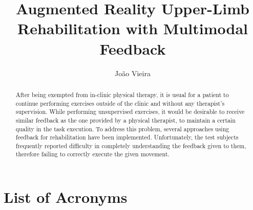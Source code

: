 \documentclass[runningheads]{llncs}
\begin{document}
\label{contbegin}

\title{Augmented Reality Upper-Limb Rehabilitation with Multimodal Feedback}


\author{Jo\~{a}o Vieira}





\maketitle


\begin{abstract}
	After being exempted from in-clinic physical therapy, 
	it is usual for a patient to continue performing exercises 
	outside of the clinic and without any therapist's supervision.
	While performing unsupervised exercises, it would be desirable 
	to receive similar feedback as the one provided by a physical therapist, to maintain 
	a certain quality in the task execution.
	To address this problem, several approaches using feedback for rehabilitation have been implemented. Unfortunately, the test subjects frequently reported difficulty in completely understanding the feedback given to them, therefore failing to correctly execute the given movement.
	
\end{abstract}









\raggedbottom
\pagebreak
\section*{List of Acronyms}
\begin{acronym}
\end{acronym}
\end{document}
